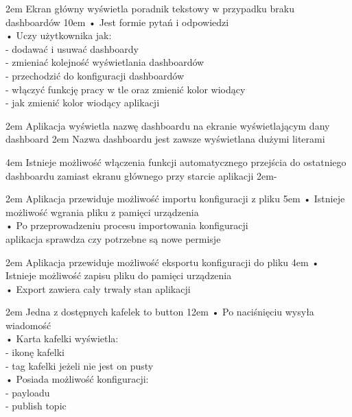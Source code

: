 {2em}{
    Ekran główny wyświetla poradnik tekstowy w przypadku braku dashboardów
}
{10em}{
    • Jest formie pytań i odpowiedzi\\
    • Uczy użytkownika jak:\\
    - dodawać i usuwać dashboardy\\
    - zmieniać kolejność wyświetlania dashboardów\\
    - przechodzić do konfiguracji dashboardów\\
    - włączyć funkcję pracy w tle oraz zmienić kolor wiodący\\
    - jak zmienić kolor wiodący aplikacji
}

{2em}{
    Aplikacja wyświetla nazwę dashboardu na ekranie wyświetlającym dany dashboard
}
{2em}{
    Nazwa dashboardu jest zawsze wyświetlana dużymi literami
}

{4em}{
    Istnieje możliwość włączenia funkcji automatycznego przejścia do ostatniego\\
    dashboardu zamiast ekranu głównego przy starcie aplikacji
}
{2em}{-}

{2em}{
    Aplikacja przewiduje możliwość importu konfiguracji z pliku
}
{5em}{
    • Istnieje możliwość wgrania pliku z pamięci urządzenia\\
    • Po przeprowadzeniu procesu importowania konfiguracji\\
    \hspace*{0.5em} aplikacja sprawdza czy potrzebne są nowe permisje
}

{2em}{
    Aplikacja przewiduje możliwość eksportu konfiguracji do pliku
}
{4em}{
    • Istnieje możliwość zapisu pliku do pamięci urządzenia\\
    • Export zawiera cały trwały stan aplikacji
}

{2em}{
    Jedna z dostępnych kafelek to button
}
{12em}{
    • Po naciśnięciu wysyła wiadomość\\

    • Karta kafelki wyświetla:\\
    - ikonę kafelki\\
    - tag kafelki jeżeli nie jest on pusty\\

    • Posiada możliwość konfiguracji:\\
    - payloadu\\
    - publish topic
}

